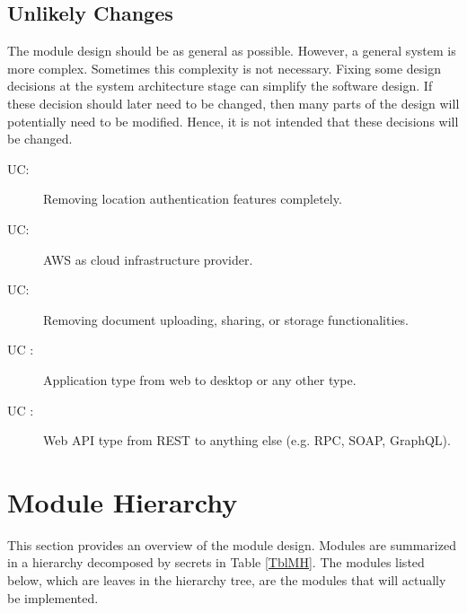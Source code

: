 \documentclass[12pt, titlepage]{article}
\newcounter{ucnum}
\newcommand{\uctheucnum}{UC\theucnum}
\begin{document}
\subsection{Unlikely Changes} \label{SecUchange}

The module design should be as general as possible. However, a general system is
more complex. Sometimes this complexity is not necessary. Fixing some design
decisions at the system architecture stage can simplify the software design. If
these decision should later need to be changed, then many parts of the design
will potentially need to be modified. Hence, it is not intended that these
decisions will be changed.

\begin{description}
  \item[ \uctheucnum \label{ucLocation}:]
    Removing location
    authentication features completely.
  \item[ \uctheucnum \label{ucAWS}:] AWS as cloud
    infrastructure provider.
  \item[ \uctheucnum \label{ucUpload}:] Removing
    document uploading, sharing, or storage functionalities.
  \item[ \uctheucnum
    \label{ucApplicationType}:] Application
    type from web to desktop or any other type.
  \item[ \uctheucnum
    \label{ucAPIType}:] Web API type from REST to anything else (e.g. RPC,
    SOAP, GraphQL).
\end{description}

\section{Module Hierarchy} \label{SecMH}

This section provides an overview of the module design. Modules are summarized
in a hierarchy decomposed by secrets in Table \ref{TblMH}. The modules listed
below, which are leaves in the hierarchy tree, are the modules that will
actually be implemented.
\end{document}
